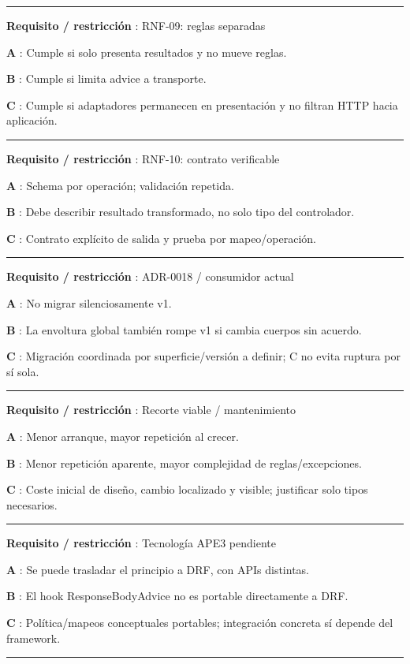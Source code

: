 \documentclass[12pt,a4paper]{report}
\begin{document}
\medskip\hrule\medskip

\textbf{Requisito / restricción }: RNF-09: reglas separadas

\textbf{A }: Cumple si solo presenta resultados y no mueve reglas.

\textbf{B }: Cumple si limita advice a transporte.

\textbf{C }: Cumple si adaptadores permanecen en presentación y no
filtran HTTP hacia aplicación.

\medskip\hrule\medskip

\textbf{Requisito / restricción }: RNF-10: contrato verificable

\textbf{A }: Schema por operación; validación repetida.

\textbf{B }: Debe describir resultado transformado, no solo tipo del
controlador.

\textbf{C }: Contrato explícito de salida y prueba por mapeo/operación.

\medskip\hrule\medskip

\textbf{Requisito / restricción }: ADR-0018 / consumidor actual

\textbf{A }: No migrar silenciosamente v1.

\textbf{B }: La envoltura global también rompe v1 si cambia cuerpos sin
acuerdo.

\textbf{C }: Migración coordinada por superficie/versión a definir; C no
evita ruptura por sí sola.

\medskip\hrule\medskip

\textbf{Requisito / restricción }: Recorte viable / mantenimiento

\textbf{A }: Menor arranque, mayor repetición al crecer.

\textbf{B }: Menor repetición aparente, mayor complejidad de
reglas/excepciones.

\textbf{C }: Coste inicial de diseño, cambio localizado y visible;
justificar solo tipos necesarios.

\medskip\hrule\medskip

\textbf{Requisito / restricción }: Tecnología APE3 pendiente

\textbf{A }: Se puede trasladar el principio a DRF, con APIs distintas.

\textbf{B }: El hook ResponseBodyAdvice no es portable directamente a
DRF.

\textbf{C }: Política/mapeos conceptuales portables; integración
concreta sí depende del framework.

\medskip\hrule\medskip
\end{document}
